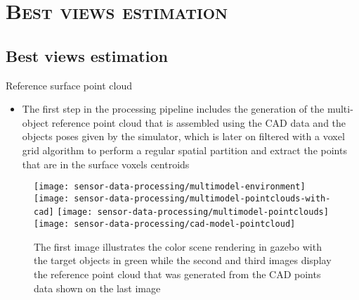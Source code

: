 \section{\scshape Best views estimation}
\subsection*{Best views estimation}

\begin{frame}{Reference surface point cloud}
	\begin{itemize}
		\item The first step in the processing pipeline includes the generation of the multi-object reference point cloud that is assembled using the CAD data and the objects poses given by the simulator, which is later on filtered with a voxel grid algorithm to perform a regular spatial partition and extract the points that are in the surface voxels centroids
	\end{itemize}
	\begin{figure}
		\centering
		\texttt{[image: sensor-data-processing/multimodel-environment]}
		\texttt{[image: sensor-data-processing/multimodel-pointclouds-with-cad]}
		\texttt{[image: sensor-data-processing/multimodel-pointclouds]}
		\texttt{[image: sensor-data-processing/cad-model-pointcloud]}
		\caption{The first image illustrates the color scene rendering in gazebo with the target objects in green while the second and third images display the reference point cloud that was generated from the CAD points data shown on the last image}
	\end{figure}
\end{frame}

